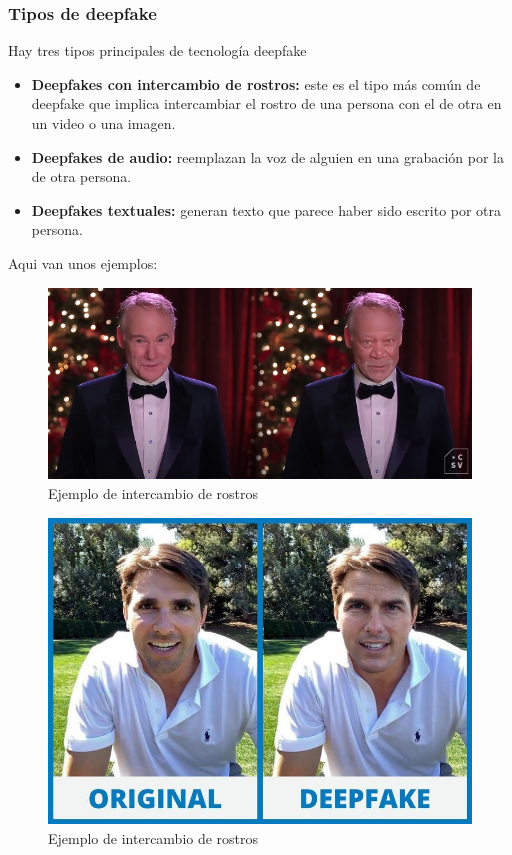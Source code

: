 \documentclass[runningheads]{llncs} %
\begin{document}
\subsubsection{Tipos de deepfake}
Hay tres tipos principales de tecnología deepfake \cite{ej-deepfake2}
\begin{itemize}
    \item{\textbf{Deepfakes con intercambio de rostros:} este es el tipo más común de deepfake 
    que implica intercambiar el rostro de una persona con el de otra en un video o una imagen.}
    \item{\textbf{Deepfakes de audio:} reemplazan la voz de alguien en una grabación por 
    la de otra persona.}
    \item{\textbf{Deepfakes textuales:} generan texto que parece haber sido escrito 
    por otra persona.}
\end{itemize}
Aqui van unos ejemplos:
\begin{figure}
    \centering
    \includegraphics[scale=0.55]{ej1-deepfake.png}
    \caption{Ejemplo de intercambio de rostros \cite{ej-deepfake3}}
    \label{fig:deepfake-ej1}
\end{figure}

\begin{figure}
    \centering
    \includegraphics[scale=0.3]{ej3-deepfake.jpeg}
    \caption{Ejemplo de intercambio de rostros \cite{img-deepfake}}
    \label{fig:deepfake-ej3}
\end{figure}
\end{document}
